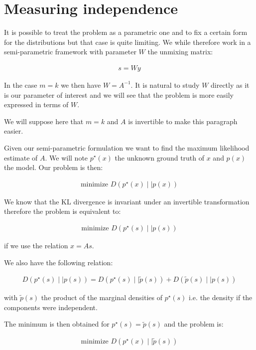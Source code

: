 \documentclass[a4paper,BCOR=5mm,oneside,openany]{scrreprt}
\begin{document}
\chapter{Measuring independence}

It is possible to treat the problem as a parametric one and to fix a certain form for the distributions but that case is quite limiting. We while therefore work in a semi-parametric framework with parameter $W$ the unmixing matrix:

\begin{align*}
	s = W y
\end{align*}

In the case $m = k$ we then have $W = A^{-1}$. It is natural to study $W$ directly as it is our parameter of interest and we will see that the problem is more easily expressed in terms of $W$.

We will suppose here that $m = k$ and $A$ is invertible to make this paragraph easier.

Given our semi-parametric formulation we want to find the maximum likelihood estimate of $A$. We will note $p^\star (x)$ the unknown ground truth of $x$ and $p(x)$ the model. Our problem is then:

\begin{align*}
	\text{minimize } D \left(p^\star(x) \mid \mid p(x) \right)
\end{align*}

We know that the KL divergence is invariant under an invertible transformation therefore the problem is equivalent to:

\begin{align*}
	\text{minimize } D \left(p^\star(s) \mid \mid p(s) \right)
\end{align*}

if we use the relation $x = A s$.

We also have the following relation:

\begin{align*}
	D(p^\star(s) \mid \mid p(s)) = D(p^\star(s) \mid \mid \tilde{p}(s)) + D( \tilde{p}(s) \mid \mid p(s))
\end{align*}

with $\tilde{p}(s)$ the product of the marginal densities of $p^\star(s)$ i.e. the density if the components were independent.

The minimum is then obtained for $p^\star(s) = \tilde{p}(s)$ and the problem is:

\begin{align*}
	\text{minimize } D \left(p^\star(x) \mid \mid \tilde{p}(s) \right)
\end{align*}
\end{document}
